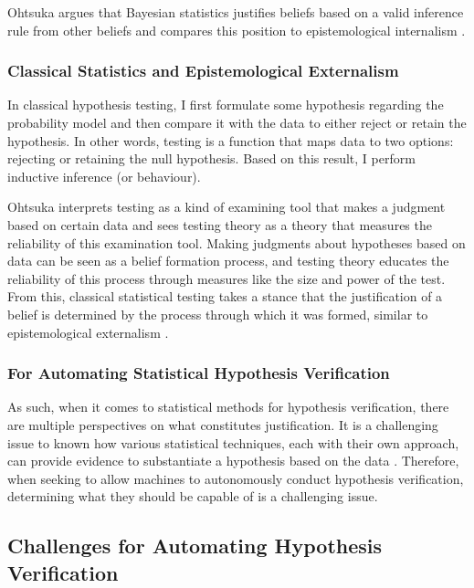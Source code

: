 Ohtsuka argues that Bayesian statistics justifies beliefs based on a valid inference rule from other beliefs and compares this position to epistemological internalism \cite{otsuka2022thinking}.

\subsubsection{Classical Statistics and Epistemological Externalism}
In classical hypothesis testing, I first formulate some hypothesis regarding the probability model and then compare it with the data to either reject or retain the hypothesis. In other words, testing is a function that maps data to two options: rejecting or retaining the null hypothesis. Based on this result, I perform inductive inference (or behaviour). 

Ohtsuka interprets testing as a kind of examining tool that makes a judgment based on certain data and sees testing theory as a theory that measures the reliability of this examination tool. Making judgments about hypotheses based on data can be seen as a belief formation process, and testing theory educates the reliability of this process through measures like the size and power of the test. From this, classical statistical testing takes a stance that the justification of a belief is determined by the process through which it was formed, similar to epistemological externalism \cite{otsuka2022thinking}.

\subsubsection{For Automating Statistical Hypothesis Verification}

As such, when it comes to statistical methods for hypothesis verification, there are multiple perspectives on what constitutes justification. It is a challenging issue to known how various statistical techniques, each with their own approach, can provide evidence to substantiate a hypothesis based on the data \cite{otsuka2022thinking,sober2008evidence,sep-statistics}. Therefore, when seeking to allow machines to autonomously conduct hypothesis verification, determining what they should be capable of is a challenging issue.

\subsection{Challenges for Automating Hypothesis Verification}

